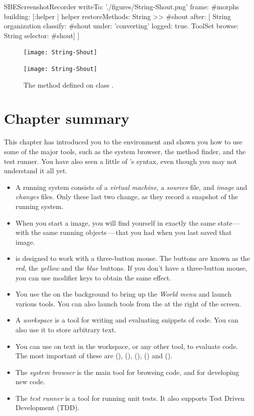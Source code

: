 \documentclass[a4paper,10pt,twoside]{book}
\begin{document}
\begin{ExecuteSmalltalkScript}
SBEScreenshotRecorder writeTo: './figures/String-Shout.png' frame: #morphs building: [:helper |
	helper restoreMethods: {String >> #shout} after: [
		String organization classify: #shout under: 'converting' logged: true.
		ToolSet browse: String selector: #shout]
]
\end{ExecuteSmalltalkScript}
\begin{figure}[hbt]
\ifluluelse
	{\centerline{\texttt{[image: String-Shout]}}}
	{\centerline{\texttt{[image: String-Shout]}}}
\caption{The  method defined on class .
\label{fig:String-shout}}
\end{figure}

\section{Chapter summary}
This chapter has introduced you to the \sq environment and shown you how to use some of the major tools, such as the system browser, the method finder, and the test runner.
You have also seen a little of \sq's syntax, even though you may not understand it all yet.

\begin{itemize}
  \item A running \sq system consists of a \emph{virtual machine}, a \emph{sources} file, and \emph{image} and \emph{changes} files.
  Only these last two change, as they record a snapshot of the running system.
  \item When you start a \sq image, you will find yourself in exactly the same state\,---\,with the same running objects\,---\,that you had when you last saved that image.
  \item \sq is designed to work with a three-button mouse.
  The buttons are known as the \emph{red}, the \emph{yellow} and the \emph{blue} buttons. If you don't have a three-button mouse, you can use modifier keys to obtain the same effect.
  \item You use the  on the \sq background to bring up the \emph{World menu} and launch various tools.
  You can also launch tools from the \toolsflapind at the right of the \sq screen.
  \item A \emph{workspace} is a tool for writing and evaluating snippets of code.
  You can also use it to store arbitrary text.
  \item You can use  on text in the workspace, or any other tool, to evaluate code.
  The most important of these are  (),  (),  (),  () and  ().
  \item The \emph{system browser} is the main tool for browsing \sq code, and for developing new code.
  \item The \emph{test runner} is a tool for running unit tests.
  It also supports Test Driven Development (TDD).
\end{itemize}

\ifx\wholebook\relax\else
   
   
\end{document}
